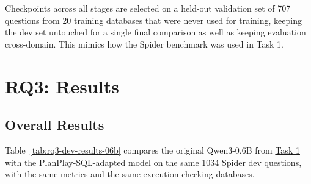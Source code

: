 Checkpoints across all stages are selected on a held-out validation set of 707 questions from 20 training databases that were never used for training, keeping the dev set untouched for a single final comparison as well as keeping evaluation cross-domain. This mimics how the Spider benchmark was used in Task 1.

\section{RQ3: Results}
\label{sec:rq3-results}

\subsection{Overall Results}
\label{sec:rq3-results-overall}

Table~\ref{tab:rq3-dev-results-06b} compares the original Qwen3-0.6B from \hyperref[sec:rq1-results]{Task 1} with the PlanPlay-SQL-adapted model on the same 1034 Spider dev questions, with the same metrics and the same execution-checking databases.

\begin{table}[H]
\centering
\footnotesize
\caption{Original and adapted Qwen3-0.6B on the Spider dev set, overall and by difficulty. Component matching is accuracy / recall / F1 (macro-averaged as in \hyperref[sec:rq1-interpretation]{Task 1}). Execution accuracy is on mock databases.}
\label{tab:rq3-dev-results-06b}
\end{table}

